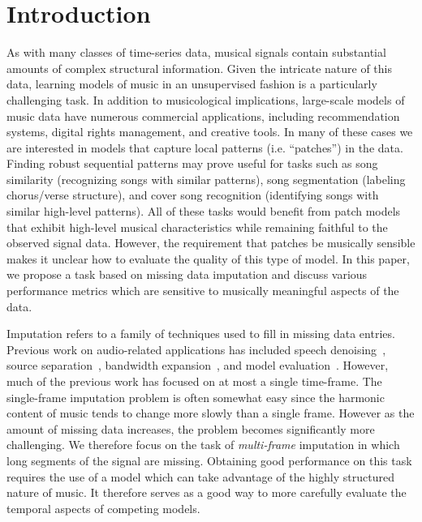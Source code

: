 \documentclass{article}
\newcommand{\FIXME}[2][FIXME]{\textcolor{blue}{\textbf{#1}: \emph{#2}}}
\begin{document}
\section{Introduction}
\label{sec:intro}
As with many classes of time-series data, musical signals contain
substantial amounts of complex structural information.  Given the
intricate nature of this data, learning models of music in an
unsupervised fashion is a particularly challenging task.  In addition
to musicological implications, large-scale models of music data have
numerous commercial applications, including recommendation systems,
digital rights management, and creative tools.  In many of these cases
we are interested in models that capture local patterns
(i.e. ``patches'') in the data.  Finding robust sequential patterns
may prove useful for tasks such as song similarity (recognizing songs
with similar patterns), song segmentation (labeling chorus/verse
structure), and cover song recognition (identifying songs with similar
high-level patterns).  All of these tasks would benefit from patch
models that exhibit high-level musical characteristics while remaining
faithful to the observed signal data.
However, the requirement that patches be musically sensible makes it
unclear how to evaluate the quality of this type of model.  In this
paper, we propose a task based on missing data imputation and discuss
various performance metrics which are sensitive to musically
meaningful aspects of the data.

Imputation refers to a family of techniques used to fill in missing
data entries.  Previous work on audio-related applications has
included speech denoising~\cite{Cooke1996,Raj1998}, source
separation~\cite{Reyes-Gomez2005}, bandwidth
expansion~\cite{Smaragdis2009}, and model
evaluation~\cite{Hoffman2010}.  However, much of the previous work has
focused on at most a single time-frame.
The single-frame imputation problem is often somewhat easy since the
harmonic content of music tends to change more slowly than a single
frame.  However as the amount of missing data increases, the problem
becomes significantly more challenging.
%
We therefore focus on the task of \emph{multi-frame} imputation in
which long segments of the signal are missing.
%
Obtaining good performance on this task requires the use of a model
which can take advantage of the highly structured nature of music.  It
therefore serves as a good way to
more carefully evaluate the temporal aspects of competing
models.  %
\end{document}
